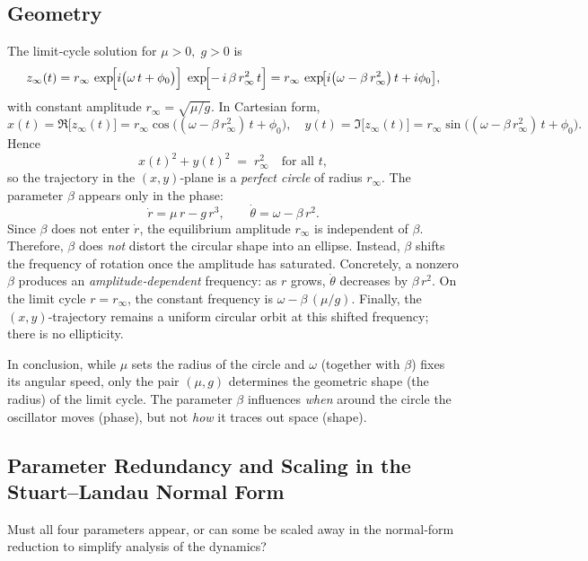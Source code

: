 \subsection{Geometry }

The limit‐cycle solution for \(\mu>0,\;g>0\) is
\[
z_{\infty}(t)
= r_{\infty}\,\exp\!\Bigl[i\bigl(\omega\,t + \phi_{0}\bigr)\Bigr]
\;\exp\!\Bigl[-\,i\,\beta\,r_{\infty}^2\,t\Bigr]
= r_{\infty}\,\exp\!\bigl[i\bigl(\omega - \beta\,r_{\infty}^2\bigr)\,t + i\phi_{0}\bigr],
\]
with constant amplitude \(r_{\infty}=\sqrt{\mu/g}\).  In Cartesian form,
\[
x(t) = \Re\bigl[z_{\infty}(t)\bigr] = r_{\infty}\cos\bigl((\omega - \beta\,r_{\infty}^2)\,t + \phi_{0}\bigr),
\quad
y(t) = \Im\bigl[z_{\infty}(t)\bigr] = r_{\infty}\sin\bigl((\omega - \beta\,r_{\infty}^2)\,t + \phi_{0}\bigr).
\]
Hence
\[
x(t)^2 + y(t)^2 \;=\; r_{\infty}^2 \quad\text{for all }t,
\]
so the trajectory in the \((x,y)\)‐plane is a \emph{perfect circle} of radius \(r_{\infty}\).  The parameter \(\beta\) appears only in the phase:
\[
\dot r = \mu\,r - g\,r^3, 
\qquad
\dot\theta = \omega - \beta\,r^2.
\]
Since \(\beta\) does not enter \(\dot r\), the equilibrium amplitude \(r_{\infty}\) is independent of \(\beta\).  Therefore, \(\beta\) does \emph{not} distort the circular shape into an ellipse.  Instead, \(\beta\) shifts the frequency of rotation once the amplitude has saturated.  Concretely, a nonzero \(\beta\) produces an \emph{amplitude‐dependent} frequency: as \(r\) grows, \(\dot\theta\) decreases by \(\beta\,r^2\).  
 On the limit cycle \(r=r_{\infty}\), the constant frequency is \(\omega - \beta\,(\mu/g)\). Finally, the \((x,y)\)‐trajectory remains a uniform circular orbit at this shifted frequency; there is no ellipticity.

  In conclusion, while \(\mu\) sets the radius of the circle and \(\omega\) (together with \(\beta\)) fixes its angular speed, only the pair \((\mu,g)\) determines the geometric shape (the radius) of the limit cycle.  The parameter \(\beta\) influences {\em when} around the circle the oscillator moves (phase), but not {\em how} it traces out space (shape).

\subsection{Parameter Redundancy and Scaling in the Stuart–Landau Normal Form}


 Must all four parameters appear, or can some be scaled away in the normal‐form reduction to simplify analysis of the dynamics?  

